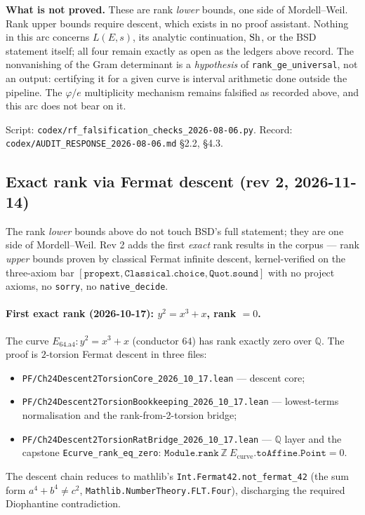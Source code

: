 \noindent \textbf{What is not proved.} These are rank \emph{lower} bounds, one
side of Mordell--Weil. Rank upper bounds require descent, which exists in no
proof assistant. Nothing in this arc concerns $L(E,s)$, its analytic
continuation, $\mathrm{Sh}$, or the BSD statement itself; all four remain exactly as
open as the ledgers above record. The nonvanishing of the Gram determinant is
a \emph{hypothesis} of \texttt{rank\_ge\_universal}, not an output: certifying
it for a given curve is interval arithmetic done outside the pipeline. The
$\varphi/e$ multiplicity mechanism remains falsified as recorded above, and
this arc does not bear on it.

\noindent Script: \texttt{codex/rf\_falsification\_checks\_2026-08-06.py}.
Record: \texttt{codex/AUDIT\_RESPONSE\_2026-08-06.md} \S2.2, \S4.3.

\subsection{Exact rank via Fermat descent (rev 2, 2026-11-14)}
\label{sec:ch24-rev2-fermat-descent}

The rank \emph{lower} bounds above do not touch BSD's full statement; they are
one side of Mordell--Weil.  Rev 2 adds the first \emph{exact} rank results in
the corpus --- rank \emph{upper} bounds proven by classical Fermat infinite
descent, kernel-verified on the three-axiom bar
$[\mathtt{propext}, \mathtt{Classical.choice}, \mathtt{Quot.sound}]$ with no
project axioms, no \texttt{sorry}, no \texttt{native\_decide}.

\paragraph{First exact rank (2026-10-17): $y^2 = x^3 + x$, rank $= 0$.}

The curve $E_{64.\text{a}4}: y^2 = x^3 + x$ (conductor $64$) has rank exactly
zero over $\mathbb{Q}$.  The proof is $2$-torsion Fermat descent in three
files:
\begin{itemize}
\item \texttt{PF/Ch24Descent2TorsionCore\_2026\_10\_17.lean} --- descent core;
\item \texttt{PF/Ch24Descent2TorsionBookkeeping\_2026\_10\_17.lean} ---
  lowest-terms normalisation and the rank-from-2-torsion bridge;
\item \texttt{PF/Ch24Descent2TorsionRatBridge\_2026\_10\_17.lean} --- $\mathbb{Q}$
  layer and the capstone \texttt{Ecurve\_rank\_eq\_zero}:
  $\mathtt{Module.rank}\ \mathbb{Z}\ E_{\text{curve}}.\mathtt{toAffine.Point}
  = 0$.
\end{itemize}
The descent chain reduces to mathlib's \texttt{Int.Fermat42.not\_fermat\_42}
(the sum form $a^4 + b^4 \neq c^2$, \texttt{Mathlib.NumberTheory.FLT.Four}),
discharging the required Diophantine contradiction.

